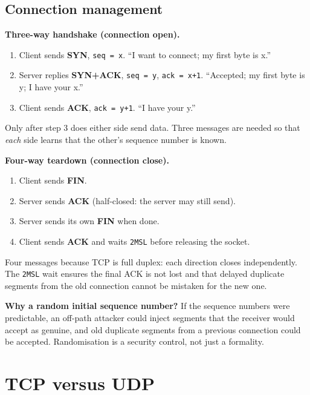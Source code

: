 \documentclass[11pt,a4paper]{article}
\begin{document}
\subsection{Connection management}

\begin{exambox}
\textbf{Three-way handshake (connection open).}
\begin{enumerate}
\item Client sends \textbf{SYN}, \texttt{seq = x}. ``I want to connect; my first byte is x.''
\item Server replies \textbf{SYN+ACK}, \texttt{seq = y}, \texttt{ack = x+1}. ``Accepted; my first byte is y; I have your x.''
\item Client sends \textbf{ACK}, \texttt{ack = y+1}. ``I have your y.''
\end{enumerate}
Only after step 3 does either side send data. Three messages are needed so that \emph{each} side learns that the other's sequence number is known.

\textbf{Four-way teardown (connection close).}
\begin{enumerate}
\item Client sends \textbf{FIN}.
\item Server sends \textbf{ACK} (half-closed: the server may still send).
\item Server sends its own \textbf{FIN} when done.
\item Client sends \textbf{ACK} and waits \texttt{2MSL} before releasing the socket.
\end{enumerate}

Four messages because TCP is full duplex: each direction closes independently. The \texttt{2MSL} wait ensures the final ACK is not lost and that delayed duplicate segments from the old connection cannot be mistaken for the new one.
\end{exambox}

\begin{dangerbox}
\textbf{Why a random initial sequence number?} If the sequence numbers were predictable, an off-path attacker could inject segments that the receiver would accept as genuine, and old duplicate segments from a previous connection could be accepted. Randomisation is a security control, not just a formality.
\end{dangerbox}

\section{TCP versus UDP}
\end{document}

